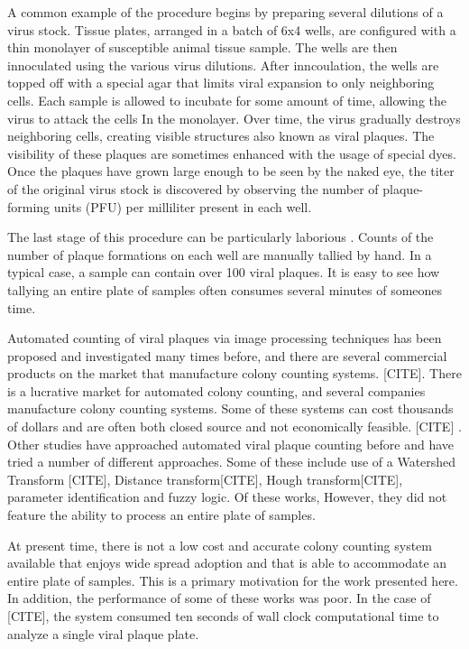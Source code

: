 \documentclass[11pt,final,twocolumn]{IEEEtran}
\begin{document}
A common example of the procedure begins by preparing several dilutions of a virus stock. Tissue plates, arranged in a batch of 6x4 wells, are configured with a thin monolayer of susceptible animal tissue sample.  The wells are then innoculated using the various virus dilutions. After inncoulation, the wells are topped off with a special agar that limits viral expansion to only neighboring cells. Each sample is allowed to incubate for some amount of time, allowing the virus to attack the cells In the monolayer. Over time, the virus gradually destroys neighboring cells, creating visible structures also known as viral plaques. The visibility of these plaques are sometimes enhanced with the usage of special dyes. Once the plaques have grown large enough to be seen by the naked eye, the titer of the original virus stock is discovered by observing the number of  plaque-forming units (PFU) per milliliter present in each well.

The last stage of this procedure can be particularly laborious . Counts  of the number of plaque formations on each well are manually tallied by hand. In a typical case, a sample can contain over 100 viral plaques. It is easy to see how tallying an entire plate of samples often consumes several minutes of someones time. 


Automated counting of viral plaques via image processing techniques  has been proposed and investigated many times before, and there are several commercial products on the market that manufacture colony counting systems. [CITE].  There is a lucrative market for automated colony counting, and several companies manufacture colony counting systems. Some of these systems can cost thousands of dollars and are often both closed source and not economically feasible. [CITE] . Other studies have approached automated viral plaque counting before and have tried a number of different  approaches. Some of these include use of a Watershed Transform [CITE], Distance transform[CITE],  Hough transform[CITE], parameter identification and fuzzy logic. Of these works, However,  they did not feature the ability to process an entire plate of samples. 

At present time,  there is not a low cost and  accurate colony counting system available that enjoys wide spread adoption and that is able to accommodate an entire plate of samples. This is a primary motivation for the work presented here. In addition, the performance of some of these works was poor. In the case of [CITE], the system consumed ten seconds of wall clock computational time to analyze a single viral plaque plate. 
\end{document}
